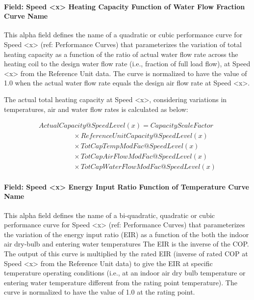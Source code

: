 \paragraph{Field: Speed \textless{}x\textgreater{} Heating Capacity Function of Water Flow Fraction Curve Name}\label{field-speed-x-heating-capacity-function-of-water-flow-fraction-curve-name}

This alpha field defines the name of a quadratic or cubic performance curve for Speed \textless{}x\textgreater{} (ref: Performance Curves) that parameterizes the variation of total heating capacity as a function of the ratio of actual water flow rate across the heating coil to the design water flow rate (i.e., fraction of full load flow), at Speed \textless{}x\textgreater{} from the Reference Unit data. The curve is normalized to have the value of 1.0 when the actual water flow rate equals the design air flow rate at Speed \textless{}x\textgreater{}.

The actual total heating capacity at Speed \textless{}x\textgreater{}, considering variations in temperatures, air and water flow rates is calculated as below:

\begin{equation}
  \begin{array}{l}
    ActualCapacity@SpeedLevel\left( x \right) = CapacityScaleFactor \\
    \quad \quad \quad \quad \quad \times ReferenceUnitCapacity@SpeedLevel(x) \\
    \quad \quad \quad \quad \quad \times TotCapTempModFac@SpeedLevel(x) \\
    \quad \quad \quad \quad \quad \times TotCapAirFlowModFac@SpeedLevel(x) \\
    \quad \quad \quad \quad \quad \times TotCapWaterFlowModFac@SpeedLevel(x)
  \end{array}
\end{equation}

\paragraph{Field: Speed \textless{}x\textgreater{} Energy Input Ratio Function of Temperature Curve Name}\label{field-speed-x-energy-input-ratio-function-of-temperature-curve-name-5}

This alpha field defines the name of a bi-quadratic, quadratic or cubic performance curve for Speed \textless{}x\textgreater{} (ref: Performance Curves) that parameterizes the variation of the energy input ratio (EIR) as a function of the both the indoor air dry-bulb and entering water temperatures The EIR is the inverse of the COP. The output of this curve is multiplied by the rated EIR (inverse of rated COP at Speed \textless{}x\textgreater{} from the Reference Unit data) to give the EIR at specific temperature operating conditions (i.e., at an indoor air dry bulb temperature or entering water temperature different from the rating point temperature). The curve is normalized to have the value of 1.0 at the rating point.

